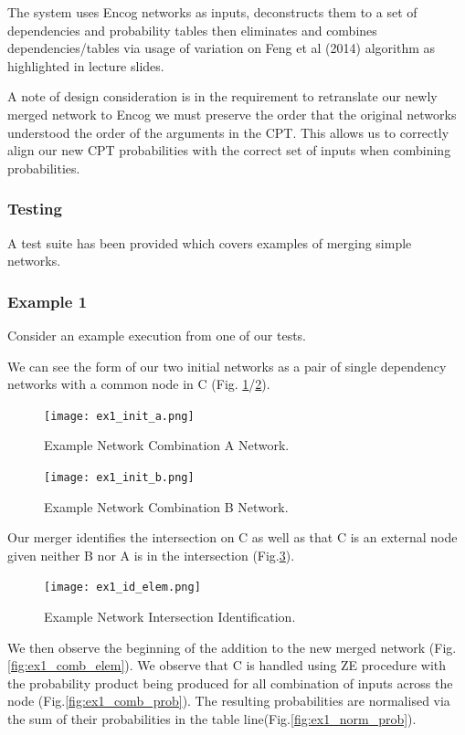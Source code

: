 \documentclass[10pt,a4paper]{article}
\begin{document}
The system uses Encog networks as inputs, deconstructs them to a set of dependencies and probability tables then eliminates and combines dependencies/tables via usage of variation on Feng et al (2014) algorithm as highlighted in lecture slides\cite{feng}.

A note of design consideration is in the requirement to retranslate our newly merged network to Encog we must preserve the order that the original networks understood the order of the arguments in the CPT. This allows us to correctly align our new CPT  probabilities with the correct set of inputs when combining probabilities.
\subsubsection{Testing}

A test suite has been provided which covers examples of merging simple networks.

\subsubsection{Example 1}

Consider an example execution from one of our tests.

We can see the form of our two initial networks as a pair of single dependency networks with a common node in C (Fig. \ref{fig:ex1_init_a}/\ref{fig:ex1_init_b}).
\begin{figure}
\centering
  \texttt{[image: ex1\_init\_a.png]}
  \caption{Example Network Combination A Network.}
  \label{fig:ex1_init_a}
\end{figure}

\begin{figure}
\centering
  \texttt{[image: ex1\_init\_b.png]}
  \caption{Example Network Combination B Network.}
  \label{fig:ex1_init_b}
\end{figure}

Our merger identifies the intersection on C as well as that C is an external node given neither B nor A is in the intersection (Fig.\ref{fig:ex1_id_elem}).

\begin{figure}
\centering
  \texttt{[image: ex1\_id\_elem.png]}
  \caption{Example Network Intersection Identification.}
  \label{fig:ex1_id_elem}
\end{figure}

We then observe the beginning of the addition to the new merged network (Fig. \ref{fig:ex1_comb_elem}). We observe that C is handled using ZE procedure with the probability product being produced for all combination of inputs across the node (Fig.\ref{fig:ex1_comb_prob}). The resulting probabilities are normalised via the sum of their probabilities in the table line(Fig.\ref{fig:ex1_norm_prob}).
\end{document}
